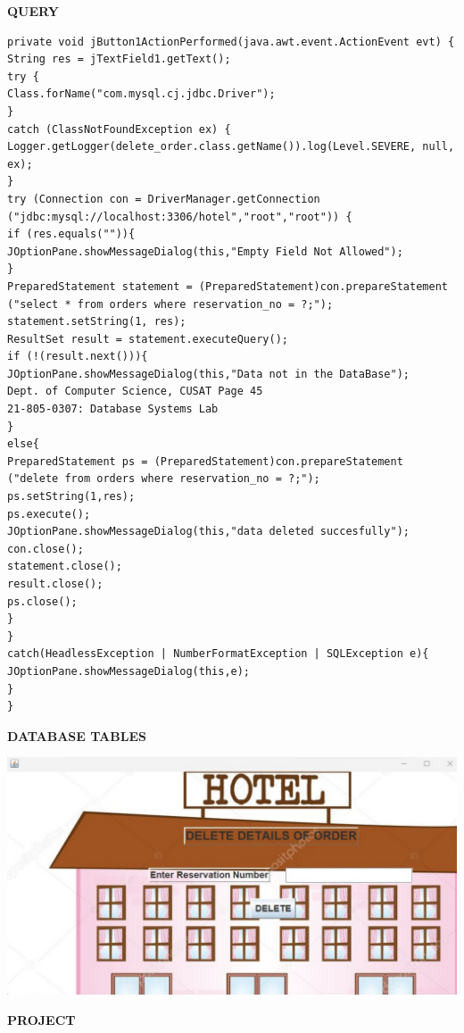 \documentclass[a4paper,12pt]{report}
\begin{document}
\begin{flushleft}
\textbf{QUERY }
\end{flushleft}
 \begin{verbatim}
private void jButton1ActionPerformed(java.awt.event.ActionEvent evt) {
String res = jTextField1.getText();
try {
Class.forName("com.mysql.cj.jdbc.Driver");
}
catch (ClassNotFoundException ex) {
Logger.getLogger(delete_order.class.getName()).log(Level.SEVERE, null, ex);
}
try (Connection con = DriverManager.getConnection
("jdbc:mysql://localhost:3306/hotel","root","root")) {
if (res.equals("")){
JOptionPane.showMessageDialog(this,"Empty Field Not Allowed");
}
PreparedStatement statement = (PreparedStatement)con.prepareStatement
("select * from orders where reservation_no = ?;");
statement.setString(1, res);
ResultSet result = statement.executeQuery();
if (!(result.next())){
JOptionPane.showMessageDialog(this,"Data not in the DataBase");
Dept. of Computer Science, CUSAT Page 45
21-805-0307: Database Systems Lab
}
else{
PreparedStatement ps = (PreparedStatement)con.prepareStatement
("delete from orders where reservation_no = ?;");
ps.setString(1,res);
ps.execute();
JOptionPane.showMessageDialog(this,"data deleted succesfully");
con.close();
statement.close();
result.close();
ps.close();
}
}
catch(HeadlessException | NumberFormatException | SQLException e){
JOptionPane.showMessageDialog(this,e);
}
}\end{verbatim}
\begin{flushleft}
\textbf{DATABASE TABLES}
\end{flushleft}
\includegraphics[scale=0.4]{Connecivity4.png}

\newpage
\begin{center}
		\large\textbf{PROJECT}
	\end{center}
	
\end{document}
